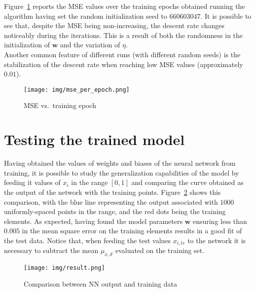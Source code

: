 \documentclass[12pt]{article}
\begin{document}
Figure\ \ref{fig:mse_epoch} reports the MSE values over the training epochs obtained running the algorithm having set the random initialization seed to $660603047$.
It is possible to see that, despite the MSE being non-increasing, the descent rate changes noticeably during the iterations.
This is a result of both the randomness in the initialization of $\textbf{w}$ and the variation of $\eta$.\\
Another common feature of different runs (with different random seeds) is the stabilization of the descent rate when reaching low MSE values (approximately $0.01$).

\begin{figure}[ht]
  \centering
  \texttt{[image: img/mse\_per\_epoch.png]}
  \caption{MSE vs.\ training epoch}\label{fig:mse_epoch}
\end{figure}

\section{Testing the trained model}\label{sec:test}

Having obtained the values of weights and biases of the neural network from training, it is possible to study the generalization capabilities of the model by feeding it values of $x_i$ in the range $[0,1]$ and comparing the curve obtained as the output of the network with the training points.
Figure\ \ref{fig:test} shows this comparison, with the blue line representing the output associated with $1000$ uniformly-spaced points in the range, and the red dots being the training elements.
As expected, having found the model parameters $\textbf{w}$ ensuring less than $0.005$ in the mean square error on the training elements results in a good fit of the test data.
Notice that, when feeding the test values $x_{i, te}$ to the network it is necessary to subtract the mean $\mu_{x,\mathcal{S}}$ evaluated on the training set.

\begin{figure}[ht]
  \centering
  \texttt{[image: img/result.png]}
  \caption{Comparison between NN output and training data}\label{fig:test}
\end{figure}
\end{document}
